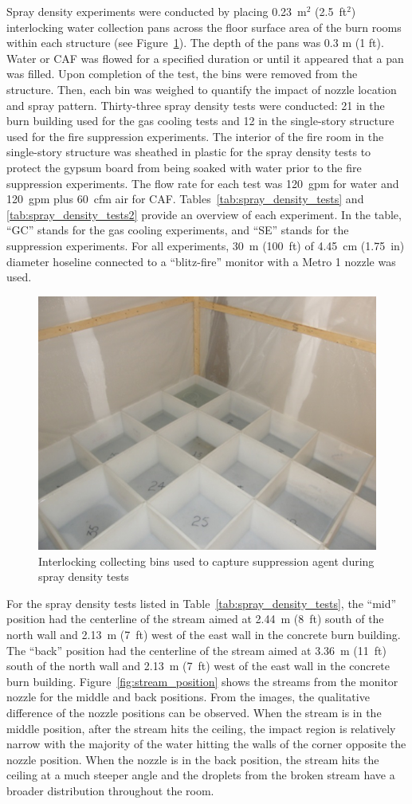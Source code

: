 \documentclass[12pt,oneside]{book}
\begin{document}
Spray density experiments were conducted by placing 0.23~m$^2$ (2.5~ft$^2$) interlocking water collection pans across the floor surface area of the burn rooms within each structure (see Figure~\ref{fig:water_buckets}). The depth of the pans was 0.3 m (1 ft).  Water or CAF was flowed for a specified duration or until it appeared that a pan was filled.  Upon completion of the test, the bins were removed from the structure. Then, each bin was weighed to quantify the impact of nozzle location and spray pattern. Thirty-three spray density tests were conducted: 21 in the burn building used for the gas cooling tests and 12 in the single-story structure used for the fire suppression experiments. The interior of the fire room in the single-story structure was sheathed in plastic for the spray density tests to protect the gypsum board from being soaked with water prior to the fire suppression experiments. The flow rate for each test was 120~gpm for water and 120~gpm plus 60~cfm air for CAF. Tables~\ref{tab:spray_density_tests} and \ref{tab:spray_density_tests2} provide an overview of each experiment. In the table, ``GC'' stands for the gas cooling experiments, and ``SE'' stands for the suppression experiments. For all experiments, 30~m (100~ft) of 4.45~cm (1.75~in) diameter hoseline connected to a ``blitz-fire'' monitor with a Metro 1 nozzle was used.

\begin{figure}[!ht]
	\includegraphics[width=.5\columnwidth]{../Figures/Pictures/Water Tests Bins.png}
	\caption{Interlocking collecting bins used to capture suppression agent during spray density tests}
	\label{fig:water_buckets}
\end{figure}

For the spray density tests listed in Table~\ref{tab:spray_density_tests}, the ``mid'' position had the centerline of the stream aimed at 2.44~m (8~ft) south of the north wall and 2.13~m (7~ft) west of the east wall in the concrete burn building.  The ``back'' position had the centerline of the stream aimed at 3.36~m (11~ft) south of the north wall and 2.13~m (7~ft) west of the east wall in the concrete burn building. Figure~\ref{fig:stream_position} shows the streams from the monitor nozzle for the middle and back positions. From the images, the qualitative difference of the nozzle positions can be observed.  When the stream is in the middle position, after the stream hits the ceiling, the impact region is relatively narrow with the majority of the water hitting the walls of the corner opposite the nozzle position.  When the nozzle is in the back position, the stream hits the ceiling at a much steeper angle and the droplets from the broken stream have a broader distribution throughout the room.
\end{document}
